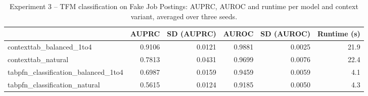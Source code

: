 \begin{table}
\centering
\caption{Experiment 3 -- TFM classification on Fake Job Postings: AUPRC, AUROC and runtime per model and context variant, averaged over three seeds.}
\label{tab:exp3_fake_jobs}
\begin{tabular}{lrrrrr}
\toprule
 & \bfseries AUPRC & \bfseries SD (AUPRC) & \bfseries AUROC & \bfseries SD (AUROC) & \bfseries Runtime (s) \\
\midrule
contexttab\_balanced\_1to4 & 0.9106 & 0.0121 & 0.9881 & 0.0025 & 21.9 \\
contexttab\_natural & 0.7813 & 0.0431 & 0.9699 & 0.0076 & 22.4 \\
tabpfn\_classification\_balanced\_1to4 & 0.6987 & 0.0159 & 0.9459 & 0.0059 & 4.1 \\
tabpfn\_classification\_natural & 0.5615 & 0.0124 & 0.9185 & 0.0050 & 4.3 \\
\bottomrule
\end{tabular}
\end{table}
